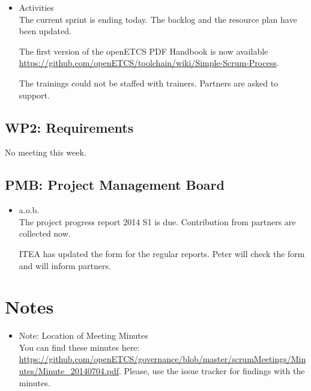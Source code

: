 \documentclass[a4paper, 11pt]{article}
\begin{document}
\begin{itemize}
\item Activities\\
The current sprint is ending today. 
The backlog and the resource plan have been updated.

The first version of the openETCS PDF Handbook is now available \url{https://github.com/openETCS/toolchain/wiki/Simple-Scrum-Process}.

The trainings could not be staffed with trainers. Partners are asked to support.
\end{itemize}

\subsection{WP2: Requirements}


No meeting this week.


\subsection{PMB: Project Management Board}
\begin{itemize}
\item a.o.b.\\
The project progress report 2014 S1 is due. Contribution from partners are collected now.

ITEA has updated the form for the regular reports. Peter will check the form and will inform partners.

\end{itemize}

\section{Notes}
\begin{itemize}

\item Note: Location of Meeting Minutes\\
You can find these minutes here: \url{https://github.com/openETCS/governance/blob/master/scrumMeetings/Minutes/Minute_20140704.pdf}. Please, use the issue tracker for findings with the minutes.

\end{itemize}
\end{document}
